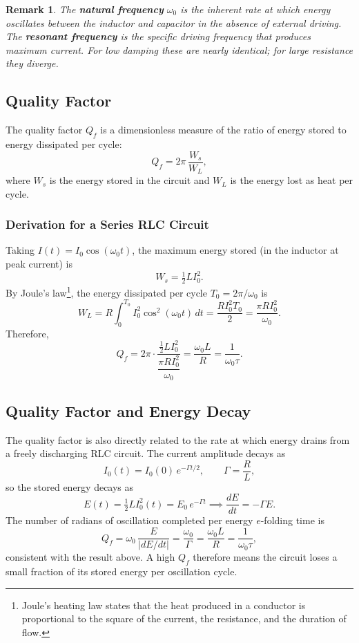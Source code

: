 \documentclass{article}
\newtheorem{remark}{Remark}
\begin{document}
\begin{remark}
    The \textbf{natural frequency} $\omega_0$ is the inherent rate at which energy oscillates between the inductor and capacitor in the absence of external driving. The \textbf{resonant frequency} is the specific driving frequency that produces maximum current. For low damping these are nearly identical; for large resistance they diverge.
\end{remark}

\subsection{Quality Factor}

The quality factor $Q_f$ is a dimensionless measure of the ratio of energy stored to energy dissipated per cycle:
\[Q_f = 2\pi\,\frac{W_s}{W_L},\]
where $W_s$ is the energy stored in the circuit and $W_L$ is the energy lost as heat per cycle.

\subsubsection{Derivation for a Series RLC Circuit}
Taking $I(t) = I_0\cos(\omega_0 t)$, the maximum energy stored (in the inductor at peak current) is
\[W_s = \tfrac{1}{2}LI_0^2.\]
By Joule's law\footnote{Joule's heating law states that the heat produced in a conductor is proportional to the square of the current, the resistance, and the duration of flow.}, the energy dissipated per cycle $T_0 = 2\pi/\omega_0$ is
\[W_L = R\int_0^{T_0} I_0^2\cos^2(\omega_0 t)\,dt = \frac{RI_0^2 T_0}{2} = \frac{\pi R I_0^2}{\omega_0}.\]
Therefore,
\[Q_f = 2\pi\cdot\frac{\tfrac{1}{2}LI_0^2}{\dfrac{\pi R I_0^2}{\omega_0}} = \frac{\omega_0 L}{R} = \frac{1}{\omega_0\tau}.\]

\subsection{Quality Factor and Energy Decay}

The quality factor is also directly related to the rate at which energy drains from a freely discharging RLC circuit. The current amplitude decays as
\[I_0(t) = I_0(0)\,e^{-\Gamma t/2}, \qquad \Gamma = \frac{R}{L},\]
so the stored energy decays as
\[E(t) = \tfrac{1}{2}LI_0^2(t) = E_0\,e^{-\Gamma t} \implies \frac{dE}{dt} = -\Gamma E.\]
The number of radians of oscillation completed per energy $e$-folding time is
\[Q_f = \omega_0\,\frac{E}{|dE/dt|} = \frac{\omega_0}{\Gamma} = \frac{\omega_0 L}{R} = \frac{1}{\omega_0\tau},\]
consistent with the result above. A high $Q_f$ therefore means the circuit loses a small fraction of its stored energy per oscillation cycle.
\end{document}

